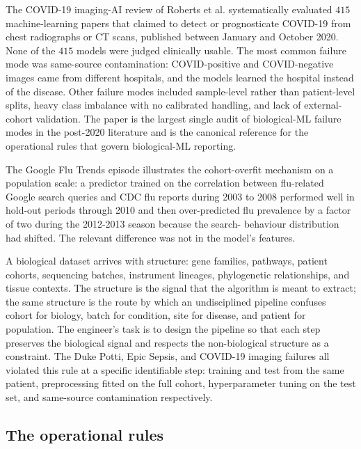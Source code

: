 The COVID-19 imaging-AI review of Roberts et al.
\cite{paper:v6c11-roberts-covid-ml-2021} systematically evaluated $415$
machine-learning papers that claimed to detect or prognosticate
COVID-19 from chest radiographs or CT scans, published between January
and October 2020. None of the $415$ models were judged clinically
usable. The most common failure mode was same-source contamination:
COVID-positive and COVID-negative images came from different hospitals,
and the models learned the hospital instead of the disease. Other
failure modes included sample-level rather than patient-level splits,
heavy class imbalance with no calibrated handling, and lack of
external-cohort validation. The paper is the largest single audit of
biological-ML failure modes in the post-2020 literature and is the
canonical reference for the operational rules that govern
biological-ML reporting.

The Google Flu Trends episode \cite{paper:v6c11-lazer-google-flu-2014}
illustrates the cohort-overfit mechanism on a population scale: a
predictor trained on the correlation between flu-related Google search
queries and CDC flu reports during 2003 to 2008 performed well in
hold-out periods through 2010 and then over-predicted flu prevalence
by a factor of two during the 2012-2013 season because the search-
behaviour distribution had shifted. The relevant difference was not in
the model's features.

\begin{principle}
A biological dataset arrives with structure: gene families, pathways,
patient cohorts, sequencing batches, instrument lineages,
phylogenetic relationships, and tissue contexts. The structure is
the signal that the algorithm is meant to extract; the same structure
is the route by which an undisciplined pipeline confuses cohort for
biology, batch for condition, site for disease, and patient for
population. The engineer's task is to design the pipeline so that
each step preserves the biological signal and respects the
non-biological structure as a constraint. The Duke Potti, Epic Sepsis,
and COVID-19 imaging failures all violated this rule at a
specific identifiable step: training and test from the same patient,
preprocessing fitted on the full cohort, hyperparameter tuning on the
test set, and same-source contamination respectively.
\end{principle}

\subsection{The operational rules}

